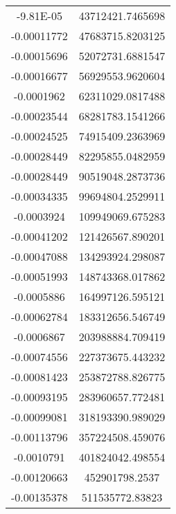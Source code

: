 \documentclass[12pt]{article}
\begin{document}
\begin{figure}
\begin{subfigure}{0.5\textwidth}
\begin{tabular}{|S[round-precision = 3, round-mode=figures, scientific-notation = true]|S[round-precision = 3,round-mode=figures, scientific-notation = true]|}
            -9.81E-05              & 43712421.7465698            \\
            -0.00011772            & 47683715.8203125            \\
            -0.00015696            & 52072731.6881547            \\
            -0.00016677            & 56929553.9620604            \\
            -0.0001962             & 62311029.0817488            \\
            -0.00023544            & 68281783.1541266            \\
            -0.00024525            & 74915409.2363969            \\
            -0.00028449            & 82295855.0482959            \\
            -0.00028449            & 90519048.2873736            \\
            -0.00034335            & 99694804.2529911            \\
            -0.0003924             & 109949069.675283            \\
            -0.00041202            & 121426567.890201            \\
            -0.00047088            & 134293924.298087            \\
            -0.00051993            & 148743368.017862            \\
            -0.0005886             & 164997126.595121            \\
            -0.00062784            & 183312656.546749            \\
            -0.0006867             & 203988884.709419            \\
            -0.00074556            & 227373675.443232            \\
            -0.00081423            & 253872788.826775            \\
            -0.00093195            & 283960657.772481            \\
            -0.00099081            & 318193390.989029            \\
            -0.00113796            & 357224508.459076            \\
            -0.0010791             & 401824042.498554            \\
            -0.00120663            & 452901798.2537              \\
            -0.00135378            & 511535772.83823             \\

\end{tabular}
\end{subfigure}
\end{figure}
\end{document}

